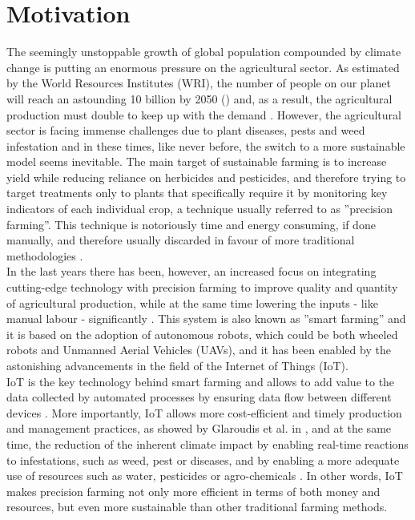 \chapter{Motivation}
The seemingly unstoppable growth of global population compounded by climate change is putting an enormous pressure on the agricultural sector. As estimated by the World Resources Institutes (WRI), the number of people on our planet will reach an astounding 10 billion by 2050 (\cite{ayaz_internet--things_2019}) and, as a result, the agricultural production must double to keep up with the demand \cite{singh_machine_2016}. However, the agricultural sector is facing immense challenges due to plant diseases, pests and weed infestation and in these times, like never before, the switch to a more sustainable model seems inevitable. The main target of sustainable farming is to increase yield while reducing reliance on herbicides and pesticides, and therefore trying to target treatments only to plants that specifically require it by monitoring key indicators of each individual crop, a technique usually referred to as ''precision farming''. This technique is notoriously time and energy consuming, if done manually, and therefore usually discarded in favour of more traditional methodologies \cite{lottes_effective_2016}.\\
In the last years there has been, however, an increased focus on integrating cutting-edge technology with precision farming to improve quality and quantity of agricultural production, while at the same time lowering the inputs - like manual labour - significantly \cite{islam_review_2021}.  This system is also known as ''smart farming'' and it is based on the adoption of autonomous robots, which could be both wheeled robots and Unmanned Aerial Vehicles (UAVs), and it has been enabled by the astonishing advancements in the field of the Internet of Things (IoT). \\
IoT is the key technology behind smart farming and allows to add value to the data collected by automated processes by ensuring data flow between different devices  \cite{islam_review_2021}.  More importantly, IoT allows more cost-efficient and timely production and management practices, as showed by  Glaroudis et al. in \cite{glaroudis_survey_2020}, and at the same time, the reduction of the inherent climate impact by enabling real-time reactions to infestations,  such as weed, pest or diseases, and by enabling a more adequate use of resources such as water, pesticides or agro-chemicals \cite{islam_review_2021}.
In other words, IoT makes precision farming not only more efficient in terms of both money and resources, but even more sustainable than other traditional farming methods. \\
